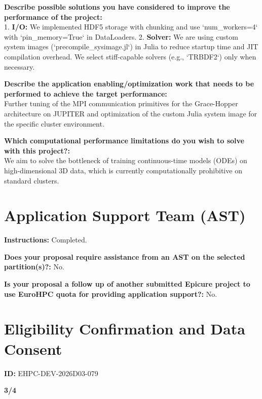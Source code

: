 \documentclass[11pt, a4paper]{article}
\begin{document}
\vspace{0.5em}
\noindent\textbf{Describe possible solutions you have considered to improve the performance of the project:} \\
1. \textbf{I/O:} We implemented HDF5 storage with chunking and use `num_workers=4` with `pin_memory=True` in DataLoaders.
2. \textbf{Solver:} We are using custom system images (`precompile_sysimage.jl`) in Julia to reduce startup time and JIT compilation overhead. We select stiff-capable solvers (e.g., `TRBDF2`) only when necessary.

\vspace{0.5em}
\noindent\textbf{Describe the application enabling/optimization work that needs to be performed to achieve the target performance:} \\
Further tuning of the MPI communication primitives for the Grace-Hopper architecture on JUPITER and optimization of the custom Julia system image for the specific cluster environment.

\vspace{0.5em}
\noindent\textbf{Which computational performance limitations do you wish to solve with this project?:} \\
We aim to solve the bottleneck of training continuous-time models (ODEs) on high-dimensional 3D data, which is currently computationally prohibitive on standard clusters.

\section*{Application Support Team (AST)}

\noindent\textbf{Instructions:} Completed.

\vspace{0.5em}
\noindent\textbf{Does your proposal require assistance from an AST on the selected partition(s)?:} No.

\vspace{0.5em}
\noindent\textbf{Is your proposal a follow up of another submitted Epicure project to use EuroHPC quota for providing application support?:} No.

\section*{Eligibility Confirmation and Data Consent}
\noindent\textbf{ID:} EHPC-DEV-2026D03-079

\vspace{0.5em}
\noindent\textbf{3/4}
\end{document}
